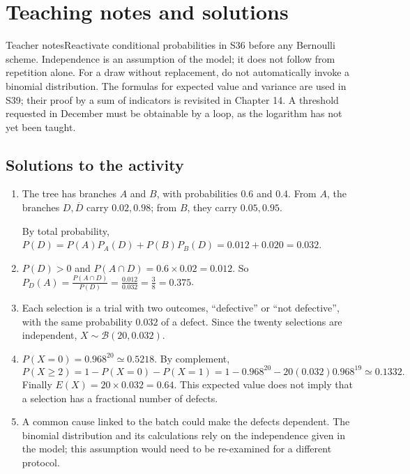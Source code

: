 \ifprof\clearpage\section{Teaching notes and solutions}\begin{profbox}{Teacher notes}Reactivate conditional probabilities in S36 before any Bernoulli scheme. Independence is an assumption of the model; it does not follow from repetition alone. For a draw without replacement, do not automatically invoke a binomial distribution. The formulas for expected value and variance are used in S39; their proof by a sum of indicators is revisited in Chapter 14. A threshold requested in December must be obtainable by a loop, as the logarithm has not yet been taught.\end{profbox}

\subsection{Solutions to the activity}\begin{enumerate}
\item The tree has branches $A$ and $B$, with probabilities $0.6$ and $0.4$. From $A$, the branches $D,\overline D$ carry $0.02,0.98$; from $B$, they carry $0.05,0.95$.
\begin{center}\end{center}
By total probability, $P(D)=P(A)P_A(D)+P(B)P_B(D)=0.012+0.020=0.032$.
\item $P(D)>0$ and $P(A\cap D)=0.6\times0.02=0.012$. So $P_D(A)=\frac{P(A\cap D)}{P(D)}=\frac{0.012}{0.032}=\frac{3}{8}=0.375$.
\item Each selection is a trial with two outcomes, ``defective'' or ``not defective'', with the same probability $0.032$ of a defect. Since the twenty selections are independent, $X\sim\mathcal B(20,0.032)$.
\item $P(X=0)=0.968^{20}\simeq0.5218$. By complement,
\[P(X\ge2)=1-P(X=0)-P(X=1)=1-0.968^{20}-20(0.032)0.968^{19}\simeq0.1332.\]
Finally $E(X)=20\times0.032=0.64$. This expected value does not imply that a selection has a fractional number of defects.
\item A common cause linked to the batch could make the defects dependent. The binomial distribution and its calculations rely on the independence given in the model; this assumption would need to be re-examined for a different protocol.
\end{enumerate}

